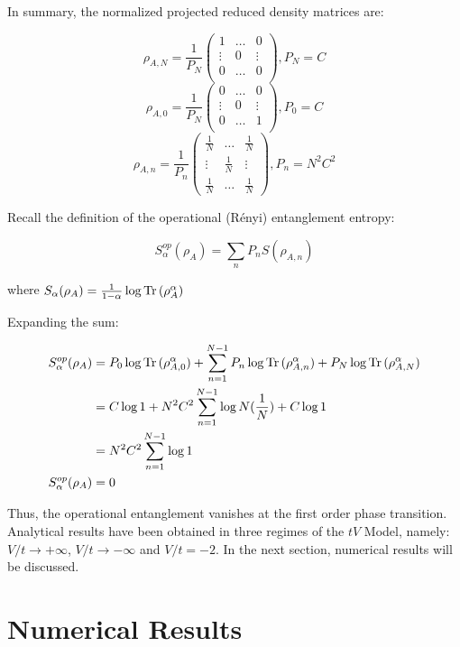 In summary, the normalized projected reduced density matrices are:

\[ \rho_{A,N} = \frac{1}{P_{N}} \begin{pmatrix}
1 & \dots & 0 \\ 
\vdots & 0 & \vdots \\
0 & \dots & 0 \\
\end{pmatrix}, P_{N}=C \]
\[ \rho_{A,0} = \frac{1}{P_{N}} \begin{pmatrix}
0 & \dots & 0 \\ 
\vdots & 0 & \vdots \\
0 & \dots & 1 \\
\end{pmatrix}, P_{0}=C\]
\[ \rho_{A,n} = \frac{1}{P_{n}} \begin{pmatrix}
\frac{1}{N} & \dots & \frac{1}{N} \\ 
\vdots & \frac{1}{N} & \vdots \\
\frac{1}{N} & \dots & \frac{1}{N}
\end{pmatrix}, P_{n}=N^2C^2 \]

Recall the definition of the operational (R\'enyi) entanglement entropy:

\[S_{\alpha}^{op}(\rho_{A}) = \sum_{n} P_{n}S(\rho_{A,n})\]

where $S_{\alpha}(\rho_A) = \frac{1}{1-\alpha} \log{\operatorname{Tr}{(\rho_A^{\alpha})}}$

Expanding the sum:

\[ \begin{aligned} S_{\alpha}^{op}(\rho_{A}) &= P_{0} \log{\operatorname{Tr}{(\rho_{A,0}^{\alpha})}} + \sum_{n=1}^{N-1} P_{n} \log{\operatorname{Tr}{(\rho_{A,n}^{\alpha})}} + P_{N} \log{\operatorname{Tr}{(\rho_{A,N}^{\alpha})}} \\
&= C \log{1} + N^2C^2 \sum_{n=1}^{N-1} \log{N(\frac{1}{N})} + C \log{1} \\
&= N^2C^2 \sum_{n=1}^{N-1} \log{1} \\
S_{\alpha}^{op}(\rho_{A}) &= 0 \\
\end{aligned} \]

Thus, the operational entanglement vanishes at the first order phase transition. \\

Analytical results have been obtained in three regimes of the $tV$ Model, namely: $V/t \to + \infty$, $V/t \to - \infty$ and $V/t = -2$. In the next section, numerical results will be discussed.

\section{Numerical Results}

